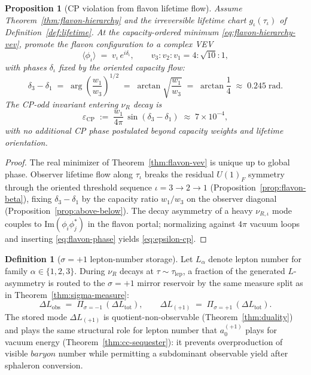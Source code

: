 \documentclass[11pt]{article}
\theoremstyle{plain}
\newtheorem{proposition}[theorem]{Proposition}
\theoremstyle{definition}
\newtheorem{definition}[theorem]{Definition}
\theoremstyle{remark}
\numberwithin{equation}{section}
\begin{document}
\begin{proposition}[CP violation from flavon lifetime flow]
\label{prop:flavon-cp}
Assume Theorem~\ref{thm:flavon-hierarchy} and the irreversible lifetime chart
$g_\iota(\tau_\iota)$ of Definition~\ref{def:lifetime}. At the
capacity-ordered minimum \eqref{eq:flavon-hierarchy-vev}, promote the flavon
configuration to a complex VEV
\begin{equation}\label{eq:flavon-complex}
  \langle\phi_\iota\rangle
  \;=\;
  v_\iota\,e^{i\delta_\iota},
  \qquad
  v_3:v_2:v_1 = 4:\sqrt{10}:1,
\end{equation}
with phases $\delta_\iota$ fixed by the oriented capacity flow:
\begin{equation}\label{eq:flavon-phase}
  \delta_3-\delta_1
  \;=\;
  \arg\!\left(\frac{w_1}{w_3}\right)^{\!1/2}
  \;=\;
  \arctan\!\sqrt{\frac{w_1}{w_3}}
  \;=\;
  \arctan\frac{1}{4}
  \;\approx\; 0.245\;\mathrm{rad}.
\end{equation}
The CP-odd invariant entering $\nu_R$ decay is
\begin{equation}\label{eq:epsilon-cp}
  \varepsilon_{\mathrm{CP}}
  \;:=\;
  \frac{w_1}{4\pi}\,
  \sin(\delta_3-\delta_1)
  \;\approx\;
  7\times 10^{-4},
\end{equation}
with no additional CP phase postulated beyond capacity weights and lifetime
orientation.
\end{proposition}

\begin{proof}
The real minimizer of Theorem~\ref{thm:flavon-vev} is unique up to global
phase. Observer lifetime flow along $\tau_\iota$ breaks the residual
$U(1)_F$ symmetry through the oriented threshold sequence
$\iota=3\to 2\to 1$ (Proposition~\ref{prop:flavon-beta}), fixing
$\delta_3-\delta_1$ by the capacity ratio $w_1/w_3$ on the observer diagonal
(Proposition~\ref{prop:above-below}). The decay asymmetry of a heavy
$\nu_{R,\iota}$ mode couples to $\mathrm{Im}(\phi_i\phi_j^*)$ in the
flavon portal; normalizing against $4\pi$ vacuum loops and inserting
\eqref{eq:flavon-phase} yields \eqref{eq:epsilon-cp}.
\end{proof}

\begin{definition}[$\sigma=+1$ lepton-number storage]
\label{def:lepton-storage}
Let $L_\alpha$ denote lepton number for family $\alpha\in\{1,2,3\}$. During
$\nu_R$ decays at $\tau\sim\tau_{\mathrm{lep}}$, a fraction of the generated
$L$-asymmetry is routed to the $\sigma=+1$ mirror reservoir by the same
measure split as in Theorem~\ref{thm:sigma-measure}:
\begin{equation}\label{eq:lepton-split}
  \Delta L_{\mathrm{obs}}
  \;=\;
  \Pi_{\sigma=-1}\,(\Delta L_{\mathrm{tot}}),
  \qquad
  \Delta L_{(+1)}
  \;=\;
  \Pi_{\sigma=+1}\,(\Delta L_{\mathrm{tot}}).
\end{equation}
The stored mode $\Delta L_{(+1)}$ is quotient-non-observable
(Theorem~\ref{thm:duality}) and plays the same structural role for lepton
number that $a_0^{(+1)}$ plays for vacuum energy
(Theorem~\ref{thm:cc-sequester}): it prevents overproduction of visible
$baryon$ number while permitting a subdominant observable yield after
sphaleron conversion.
\end{definition}
\end{document}

